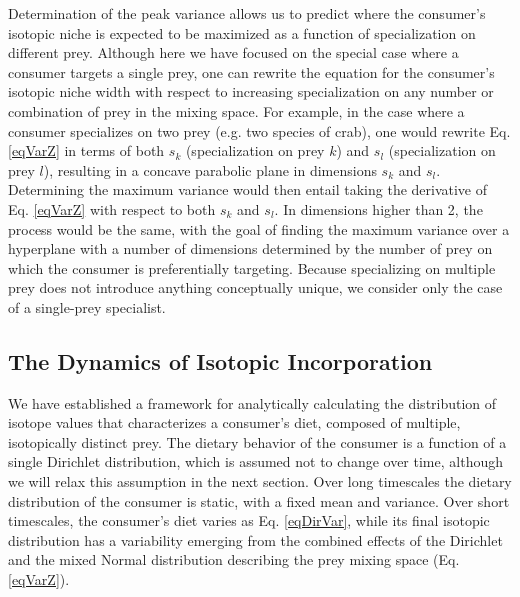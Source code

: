 \documentclass{article}
\begin{document}
Determination of the peak variance allows us to predict where the consumer's isotopic niche is expected to be maximized as a function of specialization on different prey.
Although here we have focused on the special case where a consumer targets a single prey, one can rewrite the equation for the consumer's isotopic niche width with respect to increasing specialization on any number or combination of prey in the mixing space.
For example, in the case where a consumer specializes on two prey (e.g. two species of crab), one would rewrite Eq. \ref{eqVarZ} in terms of both $s_k$ (specialization on prey $k$) and $s_l$ (specialization on prey $l$), resulting in a concave parabolic plane in dimensions $s_k$ and $s_l$.
Determining the maximum variance would then entail taking the derivative of Eq. \ref{eqVarZ} with respect to both $s_k$ and $s_l$.
In dimensions higher than 2, the process would be the same, with the goal of finding the maximum variance over a hyperplane with a number of dimensions determined by the number of prey on which the consumer is preferentially targeting.
Because specializing on multiple prey does not introduce anything conceptually unique, we consider only the case of a single-prey specialist.



\subsection*{The Dynamics of Isotopic Incorporation}
We have established a framework for analytically calculating the distribution of isotope values that characterizes a consumer's diet, composed of multiple, isotopically distinct prey.
The dietary behavior of the consumer is a function of a single Dirichlet distribution, which is assumed not to change over time, although we will relax this assumption in the next section.
Over long timescales the dietary distribution of the consumer is static, with a fixed mean and variance.
Over short timescales, the consumer's diet varies as Eq. \ref{eqDirVar}, while its final isotopic distribution has a variability emerging from the combined effects of the Dirichlet and the mixed Normal distribution describing the prey mixing space (Eq. \ref{eqVarZ}).
\end{document}
